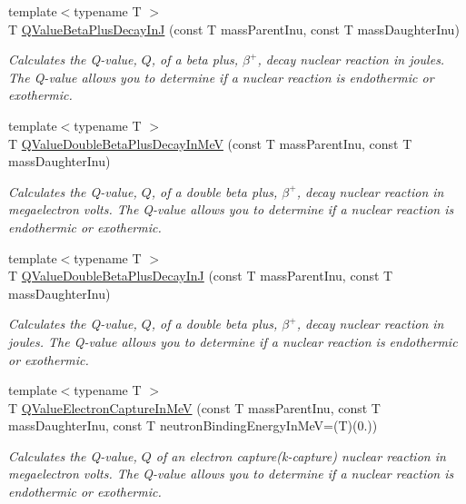\begin{DoxyCompactItemize}
{\footnotesize template$<$typename T $>$ }\\T \mbox{\hyperlink{group___e_g_x_phys-_q_value-_beta_plus_gaaee51753f077c9fe05188aa5b24f642e}{Q\+Value\+Beta\+Plus\+Decay\+InJ}} (const T mass\+Parent\+Inu, const T mass\+Daughter\+Inu)
\begin{DoxyCompactList}\small\item\em Calculates the Q-\/value, $Q$, of a beta plus, $\beta^+$, decay nuclear reaction in joules. The Q-\/value allows you to determine if a nuclear reaction is endothermic or exothermic. \end{DoxyCompactList}\item 
{\footnotesize template$<$typename T $>$ }\\T \mbox{\hyperlink{group___e_g_x_phys-_q_value-_beta_plus_gab78be314eac63ddbce441b4c8b22b47d}{Q\+Value\+Double\+Beta\+Plus\+Decay\+In\+MeV}} (const T mass\+Parent\+Inu, const T mass\+Daughter\+Inu)
\begin{DoxyCompactList}\small\item\em Calculates the Q-\/value, $Q$, of a double beta plus, $\beta^+$, decay nuclear reaction in megaelectron volts. The Q-\/value allows you to determine if a nuclear reaction is endothermic or exothermic. \end{DoxyCompactList}\item 
{\footnotesize template$<$typename T $>$ }\\T \mbox{\hyperlink{group___e_g_x_phys-_q_value-_beta_plus_ga3531ffda0c561a601a61f54f5c7780df}{Q\+Value\+Double\+Beta\+Plus\+Decay\+InJ}} (const T mass\+Parent\+Inu, const T mass\+Daughter\+Inu)
\begin{DoxyCompactList}\small\item\em Calculates the Q-\/value, $Q$, of a double beta plus, $\beta^+$, decay nuclear reaction in joules. The Q-\/value allows you to determine if a nuclear reaction is endothermic or exothermic. \end{DoxyCompactList}\item 
{\footnotesize template$<$typename T $>$ }\\T \mbox{\hyperlink{group___e_g_x_phys-_q_value-_electron_capture_ga9cd8502b6101614c17114e9710cdcf6c}{Q\+Value\+Electron\+Capture\+In\+MeV}} (const T mass\+Parent\+Inu, const T mass\+Daughter\+Inu, const T neutron\+Binding\+Energy\+In\+MeV=(T)(0.))
\begin{DoxyCompactList}\small\item\em Calculates the Q-\/value, $Q$ of an electron capture(k-\/capture) nuclear reaction in megaelectron volts. The Q-\/value allows you to determine if a nuclear reaction is endothermic or exothermic. \end{DoxyCompactList}\item 

\end{DoxyCompactItemize}

